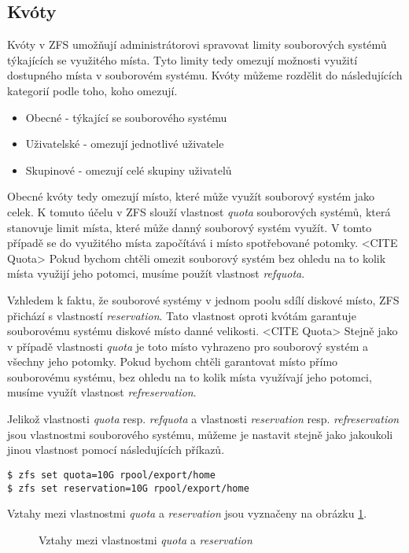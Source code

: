 \subsection{Kvóty}
\label{quota}
Kvóty v ZFS umožňují administrátorovi spravovat limity souborových systémů týkajících se využitého místa. Tyto limity tedy omezují možnosti využití dostupného místa v souborovém systému. Kvóty můžeme rozdělit do následujících kategorií podle toho, koho omezují.
\begin{itemize}
  \item Obecné - týkající se souborového systému
  \item Uživatelské - omezují jednotlivé uživatele
  \item Skupinové - omezují celé skupiny uživatelů
\end{itemize}

Obecné kvóty tedy omezují místo, které může využít souborový systém jako celek. K tomuto účelu v ZFS slouží vlastnost \emph{quota} souborových systémů, která stanovuje limit místa, které může danný souborový systém využít. V tomto případě se do využitého místa započítává i místo spotřebované potomky. <CITE Quota> Pokud bychom chtěli omezit souborový systém bez ohledu na to kolik místa využijí jeho potomci, musíme použít vlastnost \emph{refquota}.

Vzhledem k faktu, že souborové systémy v jednom poolu sdílí diskové místo, ZFS přichází s vlastností \emph{reservation}. Tato vlastnost oproti kvótám garantuje souborovému systému diskové místo danné velikosti. <CITE Quota> Stejně jako v případě vlastnosti \emph{quota} je toto místo vyhrazeno pro souborový systém a všechny jeho potomky. Pokud bychom chtěli garantovat místo přímo souborovému systému, bez ohledu na to kolik místa využívají jeho potomci, musíme využít vlastnost \emph{refreservation}.

Jelikož vlastnosti \emph{quota} resp. \emph{refquota} a vlastnosti \emph{reservation} resp. \emph{refreservation} jsou vlastnostmi souborového systému, můžeme je nastavit stejně jako jakoukoli jinou vlastnost pomocí následujících příkazů.
\begin{verbatim}
$ zfs set quota=10G rpool/export/home
$ zfs set reservation=10G rpool/export/home
\end{verbatim}

Vztahy mezi vlastnostmi \emph{quota} a \emph{reservation} jsou vyznačeny na obrázku \ref{quotavsreserv}.
\begin{figure}[h]
    \caption{Vztahy mezi vlastnostmi \emph{quota} a \emph{reservation}}
    \label{quotavsreserv}
\end{figure}

